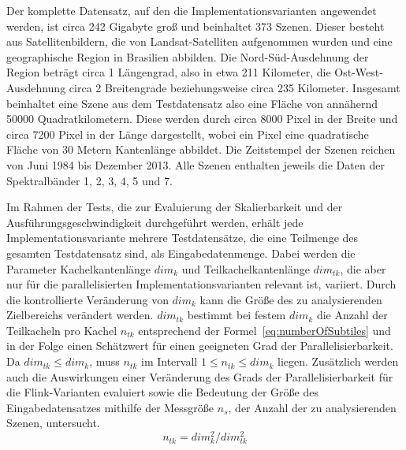 Der komplette Datensatz, auf den die Implementationsvarianten angewendet werden, ist circa 242 Gigabyte groß und beinhaltet 373 Szenen. Dieser besteht aus Satellitenbildern, die von Landsat-Satelliten aufgenommen wurden und eine geographische Region in Brasilien abbilden. Die Nord-Süd-Ausdehnung der Region beträgt circa 1 Längengrad, also in etwa 211 Kilometer, die Ost-West-Ausdehnung circa 2 Breitengrade beziehungsweise circa 235 Kilometer. Insgesamt beinhaltet eine Szene aus dem Testdatensatz also eine Fläche von annähernd 50000 Quadratkilometern. Diese werden durch circa 8000 Pixel in der Breite und circa 7200 Pixel in der Länge dargestellt, wobei ein Pixel eine quadratische Fläche von 30 Metern Kantenlänge abbildet. Die Zeitstempel der Szenen reichen von Juni 1984 bis Dezember 2013. Alle Szenen enthalten jeweils die Daten der Spektralbänder 1, 2, 3, 4, 5 und 7.

Im Rahmen der Tests, die zur Evaluierung der Skalierbarkeit und der Ausführungsgeschwindigkeit durchgeführt werden, erhält jede Implementationsvariante mehrere Testdatensätze, die eine Teilmenge des gesamten Testdatensatz sind, als Eingabedatenmenge. Dabei werden die Parameter Kachelkantenlänge $dim_k$  und Teilkachelkantenlänge $dim_{tk}$, die aber nur für die parallelisierten Implementationsvarianten relevant ist, variiert. Durch die kontrollierte Veränderung von $dim_k$ kann die Größe des zu analysierenden Zielbereichs verändert werden. $dim_{tk}$ bestimmt bei festem $dim_k$ die Anzahl der Teilkacheln pro Kachel $n_{tk}$ entsprechend der Formel~\ref{eq:numberOfSubtiles} und in der Folge einen Schätzwert für einen geeigneten Grad der Parallelisierbarkeit. Da $dim_{tk} \leq dim_k$, muss $n_{tk}$ im Intervall $1 \leq n_{tk} \leq dim_k$ liegen. Zusätzlich werden auch die Auswirkungen einer Veränderung des Grads der Parallelisierbarkeit für die Flink-Varianten evaluiert sowie die Bedeutung der Größe des Eingabedatensatzes mithilfe der Messgröße $n_s$, der Anzahl der zu analysierenden Szenen, untersucht.  
%
\begin{equation} \label{eq:numberOfSubtiles}
n_{tk} = {dim_{k}^2} / {dim_{tk}^2}
\end{equation}

